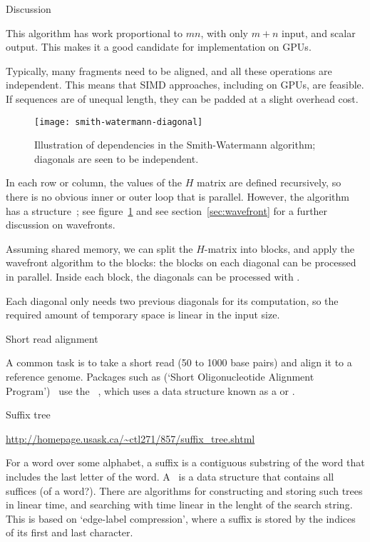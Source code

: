  {Discussion}

%
This algorithm has work proportional to $mn$, with only $m+n$ input,
and scalar output. This makes it a good candidate for implementation on \acp{GPU}.

%
Typically, many fragments need to be aligned, and all these operations
are independent. This means that SIMD approaches, including on
\acp{GPU}, are feasible. If sequences are of unequal length, they can
be padded at a slight overhead cost.

%
  \begin{figure}[ht]
  \texttt{[image: smith-watermann-diagonal]}
  \caption{Illustration of dependencies in the Smith-Watermann algorithm; diagonals are seen to be independent.}
  \label{fig:sw-diagonal}  
  \end{figure}
%
In each row or column, the values of the $H$ matrix are defined
recursively, so there is no obvious inner or outer loop that is
parallel. However, the algorithm has a 
structure~\cite{Liu:cudasw2009}; see figure~\ref{fig:sw-diagonal} and
see section~\ref{sec:wavefront} for a further discussion on
wavefronts.

Assuming shared memory, we can split the $H$-matrix into blocks, and
apply the wavefront algorithm to the blocks: the blocks on each
diagonal can be processed in parallel. Inside each block, the
diagonals can be processed with .

Each diagonal only needs two previous diagonals for its computation,
so the required amount of temporary space is linear in the input size.

 {Short read alignment}

A common task is to take a short read (50 to 1000 base pairs) and
align it to a reference genome. Packages such as  (`Short
Oligonucleotide Alignment Program')~\cite{soap2:2009} use the
%
~\cite{BurrowWheeler:report},
%
which uses a data structure known as a  or
.

 {Suffix tree}

\url{http://homepage.usask.ca/~ctl271/857/suffix_tree.shtml}

For a word over some alphabet, a suffix is a contiguous substring of
the word that includes the last letter of the
word. A~ is a data structure that contains all
suffices (of a word?). There are algorithms for constructing and
storing such trees in linear time, and searching with time linear in
the lenght of the search string. This is based on `edge-label
compression', where a suffix is stored by the indices of its first and
last character.

